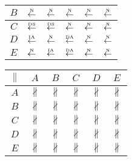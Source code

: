 \begin{table}[htbp]
\begin{subtable}{1\textwidth}
\begin{minipage}[b]{0.3\textwidth}
\begin{tabular}{|c|c|c|c|c|c|}
        $B$ & $\overset{\text{\tiny{N}}}{\leftarrow}$ & $\overset{\text{\tiny{N}}}{\leftarrow}$ & $\overset{\text{\tiny{N}}}{\leftarrow}$ & $\overset{\text{\tiny{N}}}{\leftarrow}$ & $\overset{\text{\tiny{N}}}{\leftarrow}$\\ \hline
        $C$ & $\overset{\text{\tiny{DS}}}{\leftarrow}$ & $\overset{\text{\tiny{DS}}}{\leftarrow}$ & $\overset{\text{\tiny{N}}}{\leftarrow}$ & $\overset{\text{\tiny{N}}}{\leftarrow}$ & $\overset{\text{\tiny{N}}}{\leftarrow}$\\ \hline
        $D$ & \cellcolor{lightgray}$\overset{\text{\tiny{IA}}}{\leftarrow}$ & \cellcolor{lightgray}$\overset{\text{\tiny{N}}}{\leftarrow}$ & $\overset{\text{\tiny{DA}}}{\leftarrow}$ & $\overset{\text{\tiny{N}}}{\leftarrow}$ & $\overset{\text{\tiny{N}}}{\leftarrow}$\\ \hline
        $E$ & \cellcolor{lightgray}$\overset{\text{\tiny{N}}}{\leftarrow}$ & \cellcolor{lightgray}$\overset{\text{\tiny{IA}}}{\leftarrow}$ & $\overset{\text{\tiny{DA}}}{\leftarrow}$ & $\overset{\text{\tiny{N}}}{\leftarrow}$ & $\overset{\text{\tiny{N}}}{\leftarrow}$\\ \hline
      \end{tabular}
    \end{minipage}
    \begin{minipage}[b]{0.3\textwidth}
      \centering
      \begin{tabular}{|c|c|c|c|c|c|} \hline
        $\parallel$ & $A$ & $B$ & $C$ & $D$ & $E$\\ \hline
        $A$ & $\nparallel$ & $\nparallel$ & $\nparallel$ & $\nparallel$ & $\nparallel$\\ \hline
        $B$ & $\nparallel$ & $\nparallel$ & $\nparallel$ & $\nparallel$ & $\nparallel$\\ \hline
        $C$ & $\nparallel$ & $\nparallel$ & $\nparallel$ & $\nparallel$ & $\nparallel$\\ \hline
        $D$ & $\nparallel$ & $\nparallel$ & $\nparallel$ & $\nparallel$ & $\nparallel$\\ \hline
        $E$ & $\nparallel$ & $\nparallel$ & $\nparallel$ & $\nparallel$ & $\nparallel$\\ \hline
      \end{tabular}
    \end{minipage}
  \end{subtable}


\end{table}
